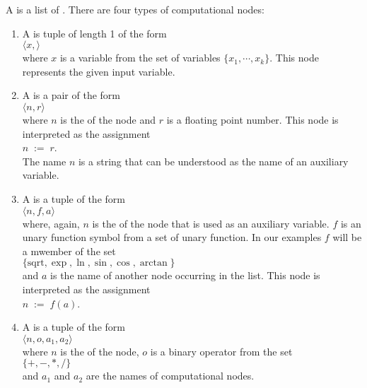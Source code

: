 \begin{Definition} 
  A   is a list of .
    There are four types of computational nodes:
  \begin{enumerate}
  \item A  is tuple of length 1 of the form   
        \\[0.2cm]
        \hspace*{1.3cm}
        $\langle x, \rangle$
        \\[0.2cm]
        where $x$ is a variable from the set of variables $\{x_1,\cdots,x_k\}$.
        This node represents the given input variable.
  \item A  is a pair of the form
        \\[0.2cm]
        \hspace*{1.3cm}
        $\langle n, r\rangle$
        \\[0.2cm]
        where $n$ is the  of the node and $r$ is a floating point number.  This node is interpreted
        as the assignment
        \\[0.2cm]
        \hspace*{1.3cm}
        $n \;\mathtt{:=}\; r$.
        \\[0.2cm]
        The name $n$ is a string that can be understood as the name of an auxiliary variable.
  \item A  is a tuple of the form
        \\[0.2cm]
        \hspace*{1.3cm}
        $\langle n, f, a\rangle$
        \\[0.2cm]
        where, again, $n$ is the  of the node that is used as an auxiliary variable. $f$ is an unary
        function symbol from a set of unary function.  In our examples $f$ will be a mwember of the set 
        \\[0.2cm]
        \hspace*{1.3cm}
        $\{ \mathrm{sqrt}, \exp, \ln, \sin, \cos, \arctan \}$
        \\[0.2cm]
        and $a$ is the name of another node occurring in the list.  This node is interpreted as the assignment
        \\[0.2cm]
        \hspace*{1.3cm}
        $n \;\mathtt{:=}\; f(a)$.        
  \item A  is a tuple of the form
        \\[0.2cm]
        \hspace*{1.3cm}
        $\langle n, o, a_1, a_2\rangle$
        \\[0.2cm]
        where $n$ is the  of the node, $o$ is a binary operator from the set
        \\[0.2cm]
        \hspace*{1.3cm}
        $\{ +, -, *, / \}$
        \\[0.2cm]
        and $a_1$ and $a_2$ are the names of computational nodes.
        

\end{enumerate}
\end{Definition}
